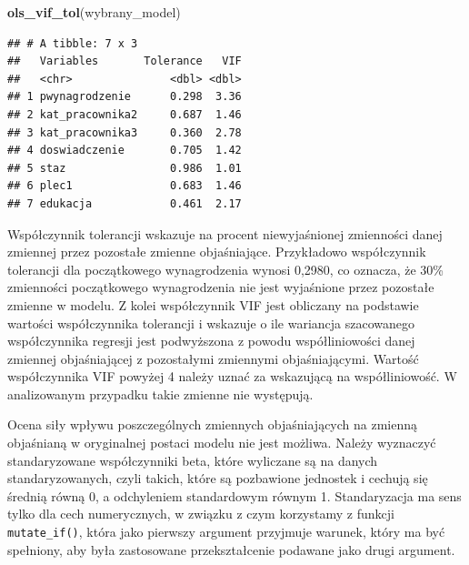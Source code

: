 \documentclass[]{book}
\newenvironment{Shaded}{\begin{snugshade}}{\end{snugshade}}
\newcommand{\DataTypeTok}[1]{\textcolor[rgb]{0.13,0.29,0.53}{#1}}
\newcommand{\KeywordTok}[1]{\textcolor[rgb]{0.13,0.29,0.53}{\textbf{#1}}}
\newcommand{\NormalTok}[1]{#1}
\newcommand{\OperatorTok}[1]{\textcolor[rgb]{0.81,0.36,0.00}{\textbf{#1}}}
\newcommand{\StringTok}[1]{\textcolor[rgb]{0.31,0.60,0.02}{#1}}
\begin{document}
\begin{Shaded}
\begin{Highlighting}[]
\KeywordTok{ols_vif_tol}\NormalTok{(wybrany_model)}
\end{Highlighting}
\end{Shaded}

\begin{verbatim}
## # A tibble: 7 x 3
##   Variables       Tolerance   VIF
##   <chr>               <dbl> <dbl>
## 1 pwynagrodzenie      0.298  3.36
## 2 kat_pracownika2     0.687  1.46
## 3 kat_pracownika3     0.360  2.78
## 4 doswiadczenie       0.705  1.42
## 5 staz                0.986  1.01
## 6 plec1               0.683  1.46
## 7 edukacja            0.461  2.17
\end{verbatim}

Współczynnik tolerancji wskazuje na procent niewyjaśnionej zmienności danej zmiennej przez pozostałe zmienne objaśniające. Przykładowo współczynnik tolerancji dla początkowego wynagrodzenia wynosi 0,2980, co oznacza, że 30\% zmienności początkowego wynagrodzenia nie jest wyjaśnione przez pozostałe zmienne w modelu. Z kolei współczynnik VIF jest obliczany na podstawie wartości współczynnika tolerancji i wskazuje o ile wariancja szacowanego współczynnika regresji jest podwyższona z powodu współliniowości danej zmiennej objaśniającej z pozostałymi zmiennymi objaśniającymi. Wartość współczynnika VIF powyżej 4 należy uznać za wskazującą na współliniowość. W analizowanym przypadku takie zmienne nie występują.

Ocena siły wpływu poszczególnych zmiennych objaśniających na zmienną objaśnianą w oryginalnej postaci modelu nie jest możliwa. Należy wyznaczyć standaryzowane współczynniki beta, które wyliczane są na danych standaryzowanych, czyli takich, które są pozbawione jednostek i cechują się średnią równą 0, a odchyleniem standardowym równym 1. Standaryzacja ma sens tylko dla cech numerycznych, w związku z czym korzystamy z funkcji \texttt{mutate\_if()}, która jako pierwszy argument przyjmuje warunek, który ma być spełniony, aby była zastosowane przekształcenie podawane jako drugi argument.

\begin{Shaded}
\end{Shaded}
\end{document}
